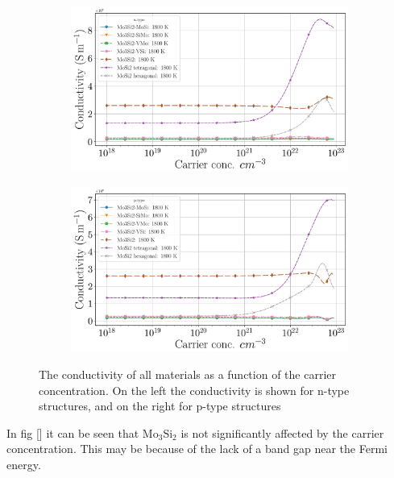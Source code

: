 \documentclass[12pt]{article}
\theoremstyle{plain}
\theoremstyle{definition}
\newcommand{\<}{\langle}
\renewcommand{\>}{\rangle}
\begin{document}
\begin{figure}[b!]
\centering
\begin{subfigure}{.5\textwidth}
  \centering
  \includegraphics[width=\linewidth]{allmats_C_doping_temp_n}
  \caption{}
  \label{fig:sub1}
\end{subfigure}%
\begin{subfigure}{.5\textwidth}
  \centering
  \includegraphics[width=\linewidth]{allmats_C_doping_temp_p}
  \caption{}
  \label{fig:sub2}
\end{subfigure}
\caption{The conductivity of all materials as a function of the carrier concentration. On the left the conductivity is shown for n-type structures, and on the right for p-type structures}
\label{fig:C-Doping}
\end{figure}


In fig [] it can be seen that $\text{Mo}_3\text{Si}_2$ is not significantly affected by the carrier concentration. This may be because of the lack of a band gap near the Fermi energy. 
\end{document}
